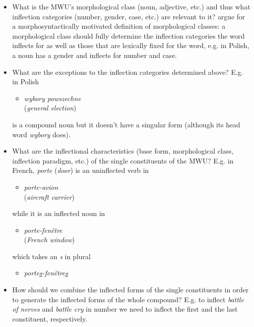 \begin{itemize}
\item What is the MWU's morphological class (noun, adjective, etc.) and thus what 
inflection categories (number, gender, case, etc.) are relevant to it? \cite{PrzepWol03} 
argue for a morphosyntactically motivated definition of morphological classes: a morphological 
class should fully determine the inflection categories the word inflects for as well as those 
that are lexically fixed for the word, e.g. in Polish, a noun has a gender and inflects for number and case.
\item What are the exceptions to the inflection categories determined above? E.g. in Polish 

\begin{itemize}
\item \emph{wybory powszechne}\\
 (\emph{general election}) 
\end{itemize}

is a compound noun but it doesn't have a singular form (although its head word \emph{wybory} does).
\item What are the inflectional characteristics (base form, morphological class, inflection 
paradigm, etc.) of the single constituents of the MWU? E.g. in French, \emph{porte} (\emph{door}) 
is an uninflected verb in 

\begin{itemize}
\item \emph{porte-avion} \\
 (\emph{aircraft carrier}) 
\end{itemize}

while it is an inflected noun in
 
\begin{itemize}
\item \emph{porte-fen\^etre} \\
(\emph{French window}) 
\end{itemize}

which takes an \emph{s} in plural 

\begin{itemize}
\item \emph{porte\underline{s}-fen\^etre\underline{s}}
\end{itemize} 
\item How should we combine the inflected forms of the single constituents in order to generate the inflected forms of the whole compound? E.g. to inflect \emph{battle of nerves} and \emph{battle cry} in number we need to inflect the first and the last constituent, respectively. 
\end{itemize}

